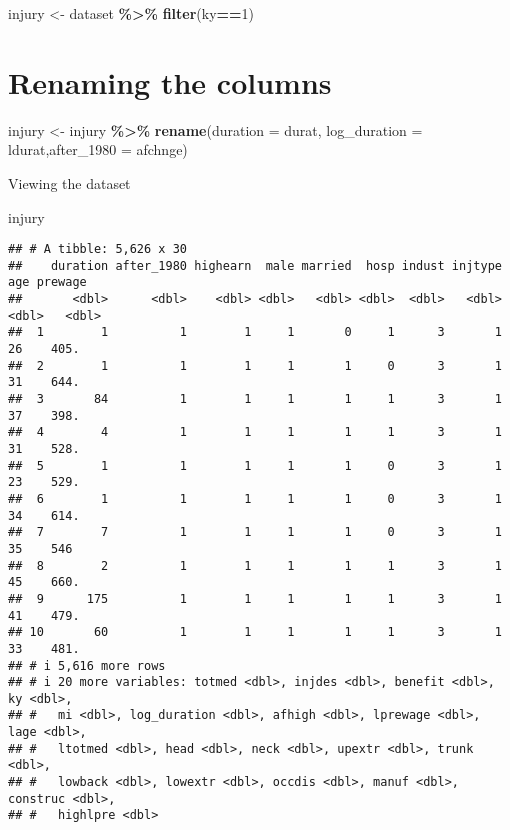 \documentclass[
]{article}
\newenvironment{Shaded}{\begin{snugshade}}{\end{snugshade}}
\newcommand{\AttributeTok}[1]{\textcolor[rgb]{0.13,0.29,0.53}{#1}}
\newcommand{\DecValTok}[1]{\textcolor[rgb]{0.00,0.00,0.81}{#1}}
\newcommand{\FunctionTok}[1]{\textcolor[rgb]{0.13,0.29,0.53}{\textbf{#1}}}
\newcommand{\NormalTok}[1]{#1}
\newcommand{\OtherTok}[1]{\textcolor[rgb]{0.56,0.35,0.01}{#1}}
\newcommand{\SpecialCharTok}[1]{\textcolor[rgb]{0.81,0.36,0.00}{\textbf{#1}}}
\begin{document}
\begin{Shaded}
\begin{Highlighting}[]
\NormalTok{injury }\OtherTok{\textless{}{-}}\NormalTok{ dataset }\SpecialCharTok{\%\textgreater{}\%} \FunctionTok{filter}\NormalTok{(ky}\SpecialCharTok{==}\DecValTok{1}\NormalTok{)}
\end{Highlighting}
\end{Shaded}

\section{Renaming the columns}\label{renaming-the-columns}

\begin{Shaded}
\begin{Highlighting}[]
\NormalTok{injury }\OtherTok{\textless{}{-}}\NormalTok{ injury }\SpecialCharTok{\%\textgreater{}\%} \FunctionTok{rename}\NormalTok{(}\AttributeTok{duration =}\NormalTok{ durat, }\AttributeTok{log\_duration =}\NormalTok{ ldurat,}\AttributeTok{after\_1980 =}\NormalTok{ afchnge)}
\end{Highlighting}
\end{Shaded}

Viewing the dataset

\begin{Shaded}
\begin{Highlighting}[]
\NormalTok{injury}
\end{Highlighting}
\end{Shaded}

\begin{verbatim}
## # A tibble: 5,626 x 30
##    duration after_1980 highearn  male married  hosp indust injtype   age prewage
##       <dbl>      <dbl>    <dbl> <dbl>   <dbl> <dbl>  <dbl>   <dbl> <dbl>   <dbl>
##  1        1          1        1     1       0     1      3       1    26    405.
##  2        1          1        1     1       1     0      3       1    31    644.
##  3       84          1        1     1       1     1      3       1    37    398.
##  4        4          1        1     1       1     1      3       1    31    528.
##  5        1          1        1     1       1     0      3       1    23    529.
##  6        1          1        1     1       1     0      3       1    34    614.
##  7        7          1        1     1       1     0      3       1    35    546 
##  8        2          1        1     1       1     1      3       1    45    660.
##  9      175          1        1     1       1     1      3       1    41    479.
## 10       60          1        1     1       1     1      3       1    33    481.
## # i 5,616 more rows
## # i 20 more variables: totmed <dbl>, injdes <dbl>, benefit <dbl>, ky <dbl>,
## #   mi <dbl>, log_duration <dbl>, afhigh <dbl>, lprewage <dbl>, lage <dbl>,
## #   ltotmed <dbl>, head <dbl>, neck <dbl>, upextr <dbl>, trunk <dbl>,
## #   lowback <dbl>, lowextr <dbl>, occdis <dbl>, manuf <dbl>, construc <dbl>,
## #   highlpre <dbl>
\end{verbatim}
\end{document}
